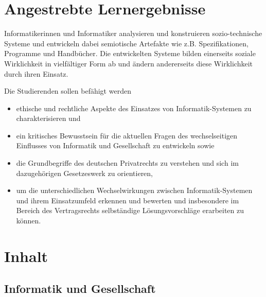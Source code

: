 \hypertarget{angestrebte-lernergebnissepathlabelmi-2017modulbeschreibungen-bachelorba_mug}{%
\section*{Angestrebte
Lernergebnisse\label{/mi-2017/modulbeschreibungen-bachelor/BA_MUG}}\label{angestrebte-lernergebnissepathlabelmi-2017modulbeschreibungen-bachelorba_mug}}

Informatikerinnen und Informatiker analysieren und konstruieren
sozio-technische Systeme und entwickeln dabei semiotische Artefakte wie
z.B. Spezifikationen, Programme und Handbücher. Die entwickelten Systeme
bilden einerseits soziale Wirklichkeit in vielfältiger Form ab und
ändern andererseits diese Wirklichkeit durch ihren Einsatz.

Die Studierenden sollen befähigt werden

\begin{itemize}
\tightlist
\item
  ethische und rechtliche Aspekte des Einsatzes von Informatik-Systemen
  zu charakterisieren und
\item
  ein kritisches Bewusstsein für die aktuellen Fragen des
  wechselseitigen Einflusses von Informatik und Gesellschaft zu
  entwickeln sowie
\item
  die Grundbegriffe des deutschen Privatrechts zu verstehen und sich im
  dazugehörigen Gesetzeswerk zu orientieren,
\item
  um die unterschiedlichen Wechselwirkungen zwischen Informatik-Systemen
  und ihrem Einsatzumfeld erkennen und bewerten und insbesondere im
  Bereich des Vertragsrechts selbständige Lösungsvorschläge erarbeiten
  zu können.
\end{itemize}

\hypertarget{inhaltpathlabelmi-2017modulbeschreibungen-bachelorba_mug}{%
\section*{Inhalt\label{/mi-2017/modulbeschreibungen-bachelor/BA_MUG}}\label{inhaltpathlabelmi-2017modulbeschreibungen-bachelorba_mug}}

\hypertarget{informatik-und-gesellschaftpathlabelmi-2017modulbeschreibungen-bachelorba_mug}{%
\subsection*{Informatik und
Gesellschaft\label{/mi-2017/modulbeschreibungen-bachelor/BA_MUG}}\label{informatik-und-gesellschaftpathlabelmi-2017modulbeschreibungen-bachelorba_mug}}

